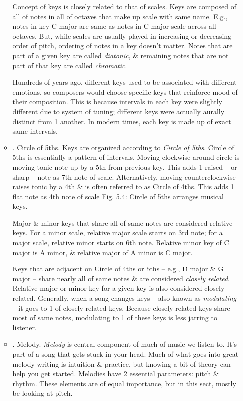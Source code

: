 \documentclass{article}
\begin{document}
\begin{itemize}
\begin{itemize}
		Concept of keys is closely related to that of scales. Keys are composed of all of notes in all of octaves that make up scale with same name. E.g., notes in key C major are same as notes in C major scale across all octaves. But, while scales are usually played in increasing or decreasing order of pitch, ordering of notes in a key doesn't matter. Notes that are part of a given key are called {\it diatonic}, \& remaining notes that are not part of that key are called {\it chromatic}.
		
		Hundreds of years ago, different keys used to be associated with different emotions, so composers would choose specific keys that reinforce mood of their composition. This is because intervals in each key were slightly different due to system of tuning; different keys were actually aurally distinct from 1 another. In modern times, each key is made up of exact same intervals.
		\item {. Circle of 5ths.} Keys are organized according to {\it Circle of 5ths}. Circle of 5ths is essentially a pattern of intervals. Moving clockwise around circle is moving tonic note up by a 5th from previous key. This adds 1 raised -- or sharp -- note as 7th note of scale. Alternatively, moving counterclockwise raises tonic by a 4th \& is often referred to as Circle of 4ths. This adds 1 flat note as 4th note of scale {\sf Fig. 5.4: Circle of 5ths arranges musical keys.}
		
		Major \& minor keys that share all of same notes are considered relative keys. For a minor scale, relative major scale starts on 3rd note; for a major scale, relative minor starts on 6th note. Relative minor key of C major is A minor, \& relative major of A minor is C major.
		
		Keys that are adjacent on Circle of 4ths or 5ths -- e.g., D major \& G major -- share nearly all of same notes \& are considered {\it closely related}. Relative major or minor key for a given key is also considered closely related. Generally, when a song changes keys -- also known as {\it modulating} -- it goes to 1 of closely related keys. Because closely related keys share most of same notes, modulating to 1 of these keys is less jarring to listener.
		\item {. Melody.} {\it Melody} is central component of much of music we listen to. It's part of a song that gets stuck in your head. Much of what goes into great melody writing is intuition \& practice, but knowing a bit of theory can help you get started. Melodies have 2 essential parameters: pitch \& rhythm. These elements are of equal importance, but in this sect, mostly be looking at pitch.
		

\end{itemize}
\end{itemize}
\end{document}
